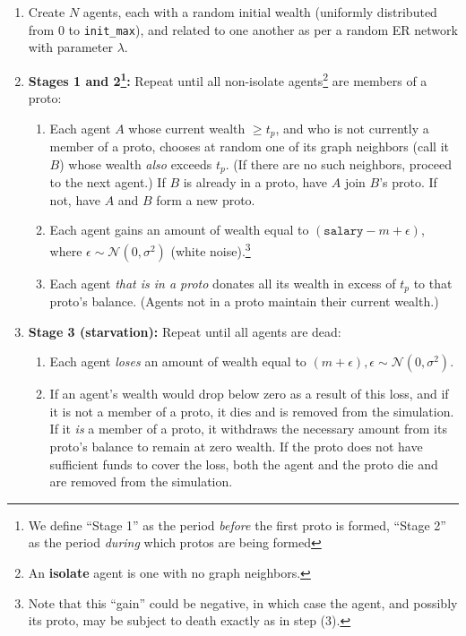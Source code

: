 \documentclass[sigconf]{acmart}
\begin{document}
\begin{enumerate}
\itemsep.1em
\item Create $N$ agents, each with a random initial wealth (uniformly distributed from 0 to \texttt{init\_max}), and related to one another as per a random ER network with parameter $\lambda$.
\item \textbf{Stages 1 and 2\footnote{We define ``Stage 1'' as the period \textit{before} the first proto is formed, ``Stage 2'' as the period \textit{during} which protos are being formed}:} Repeat until all non-isolate agents\footnote{An \textbf{isolate} agent is one with no graph neighbors.} are members of a proto:
    \begin{enumerate}
    \itemsep.1em
    \item Each agent $A$ whose current wealth $\ge t_p$, and who is not currently a member of a proto, chooses at random one of its graph neighbors (call it $B$) whose wealth \textit{also} exceeds $t_p$. (If there are no such neighbors, proceed to the next agent.) If $B$ is already in a proto, have $A$ join $B$'s proto. If not, have $A$ and $B$ form a new proto.
    \item Each agent gains an amount of wealth equal to $(\texttt{salary} - m + \epsilon)$, where $\epsilon \sim \mathcal{N}(0,\sigma^2)$ (white noise).\footnote{Note that this ``gain'' could be negative, in which case the agent, and possibly its proto, may be subject to death exactly as in step (3).}
    \item Each agent \textit{that is in a proto} donates all its wealth in excess of $t_p$ to that proto's balance. (Agents not in a proto maintain their current wealth.)
    \end{enumerate}
    \item \textbf{Stage 3 (starvation):} Repeat until all agents are dead:
        \begin{enumerate}
        \itemsep.1em
        \item Each agent \textit{loses} an amount of wealth equal to $(m + \epsilon), \epsilon \sim \mathcal{N}(0,\sigma^2)$.
        \item If an agent's wealth would drop below zero as a result of this loss, and if it is not a member of a proto, it dies and is removed from the simulation. If it \textit{is} a member of a proto, it withdraws the necessary amount from its proto's balance to remain at zero wealth. If the proto does not have sufficient funds to cover the loss, both the agent and the proto die and are removed from the simulation.
        \end{enumerate}
\end{enumerate}
\end{document}
